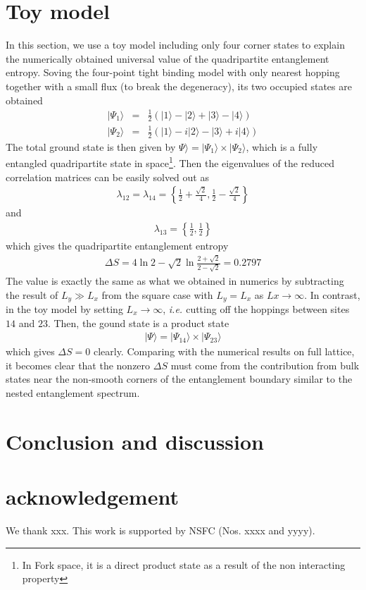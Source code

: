 \documentclass[aps,twocolumn,superscriptaddress]{revtex4-1}
\newcommand{\ie}{\textit{i.e.{ }}}
\begin{document}
\section{Toy model}
In this section, we use a toy model including only four corner states to explain the numerically obtained universal
value of the quadripartite entanglement entropy. Soving the four-point tight binding model with only nearest hopping
together with a small flux (to break the degeneracy), its two occupied states are obtained
\begin{eqnarray}
  |\Psi_1\rangle&=&\frac12\left(|1\rangle-|2\rangle+|3\rangle-|4\rangle\right) \\
  |\Psi_2\rangle&=&\frac12\left(|1\rangle-i|2\rangle-|3\rangle+i|4\rangle\right) 
\end{eqnarray}
The total ground state is then given by $\Psi\rangle=|\Psi_1\rangle \times |\Psi_2\rangle$, which is a fully entangled
quadripartite state in space\footnote{In Fork space, it is a direct product state as a result of the non interacting
property}. Then the eigenvalues of the reduced correlation matrices can be easily solved out as
\begin{eqnarray}
  \lambda_{12}=\lambda_{14}=\left\{\frac{1}{2}+\frac{\sqrt{2}}{4},\frac{1}{2}-\frac{\sqrt{2}}{4}\right\}
\end{eqnarray}
and
\begin{eqnarray}
  \lambda_{13}=\left\{\frac{1}{2},\frac{1}{2}\right\}
\end{eqnarray}
which gives the quadripartite entanglement entropy
\begin{eqnarray}
  \Delta S= 4\ln2-\sqrt{2}\ln\frac{2+\sqrt{2}}{2-\sqrt{2}}=0.2797
\end{eqnarray}
The value is exactly the same as what we obtained in numerics by subtracting the result of $L_y\gg L_x$ 
from the square case with $L_y=L_x$ as $Lx\rightarrow\infty$. 
In contrast, in the toy model by setting $L_x\rightarrow\infty$, \ie cutting off the hoppings between sites $14$ and
$23$. Then, the gound state is a product state
\begin{eqnarray}
  |\Psi\rangle=|\Psi_{14}\rangle \times |\Psi_{23}\rangle
\end{eqnarray}
which gives $\Delta S=0$ clearly. Comparing with the numerical results on full lattice, it becomes clear that the
nonzero $\Delta S$ must come from the contribution from bulk states near the non-smooth corners of the entanglement 
boundary \cite{Laflorencie2016} similar to the nested entanglement spectrum\cite{Schindler2017}. 

\section{Conclusion and discussion}

\section{acknowledgement}
We thank xxx. This work is supported by NSFC (Nos. xxxx and yyyy).


\end{document}

